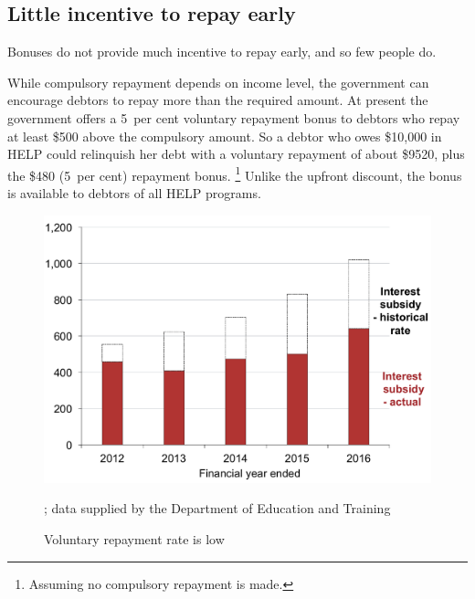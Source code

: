 \documentclass[embargoed]{grattan}
\begin{document}
\subsection{Little incentive to repay early}\label{little-incentive-to-repay-early}

Bonuses do not provide much incentive to repay early, and so few people do.

While compulsory repayment depends on income level, the government can encourage debtors to repay more than the required amount.
At present the government offers a 5~per cent voluntary repayment bonus to debtors who repay at least \$500 above the compulsory amount.
So a debtor who owes \$10,000 in \gls{HELP} could relinquish her debt with a voluntary repayment of about \$9520, plus the \$480 (5~per cent) repayment bonus.%
\footnote{Assuming no compulsory repayment is made.} 
Unlike the upfront discount, the bonus is available to debtors of all \gls{HELP} programs.

\begin{figure}
\caption{Voluntary repayment rate is low}\label{fig:fig8-voluntary-repayment-rate-is-low}

\includegraphics[page=8]{atlas/Chartpack.pdf}

{\textcites{Jackson2003TheHigherEducationContributionScheme}{Education2015Highereducationreport}; data supplied by the Department of Education and Training}
\end{figure}
\end{document}
